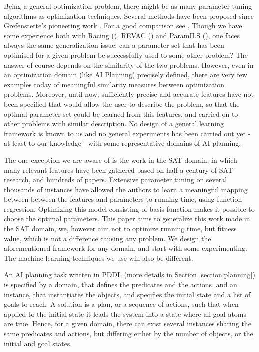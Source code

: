 \documentclass{article}
\begin{document}
Being a general optimization problem, there might be as many parameter tuning algorithms as optimization techniques. Several methods have been proposed  since Grefenstette's pioneering work \cite{Grefenstette86}. For a good comparison see \cite{Montero:2010}. Though we have some experience both with Racing (\cite{bibai:2009}), REVAC (\cite{Nannen07}) and ParamILS (\cite{ParamILS-JAIR}), one faces always the same generalization issue: can a parameter set that has been optimised for a given problem be successfully used to some other problem? The answer of course depends on the similarity of the two problems. However, even in an optimization domain (like AI Planning) precisely defined, there are very few examples today of meaningful similarity measures between optimization problems. Moreover, until now, sufficiently precise and accurate features have not been specified that would allow the user to describe the problem, so that the optimal parameter set could be learned from this features, and carried on to other problems with similar description. No design of a general learning framework is known to us and no general experiments has been carried out yet - at least to our knowledge - with some representative domains of AI planning.

The one exception we are aware of is the work \cite{Hutter06} in the SAT domain, in which many relevant features have been gathered based on half a century of SAT-research, and hundreds of papers. Extensive parameter tuning on several thousands of instances have allowed the authors to learn a meaningful mapping between between the features and parameters to running time, using function regression. Optimizing this model consisting of basis function makes it possible to choose the optimal parameters. This paper aims to generalize this work made in the SAT domain, we, however aim not to optimize running time, but fitness value, which is not a difference causing any problem. We design the aforementioned framework for any domain, and start with some experimenting. The machine learning techniques we use will also be different.

An AI planning task written in PDDL (more details in Section \ref{section:planning}) is specified by a domain, that defines the predicates and the actions, and an instance, that instantiates the objects, and specifies the initial state and a list of goals to reach. A solution is a plan, or a sequence of actions, such that when applied to the initial state it leads the system into a state where all goal atoms are true. Hence, for a given domain, there can exist several instances sharing the same predicates and actions, but differing either by the number of objects, or the initial and goal states. 
\end{document}
